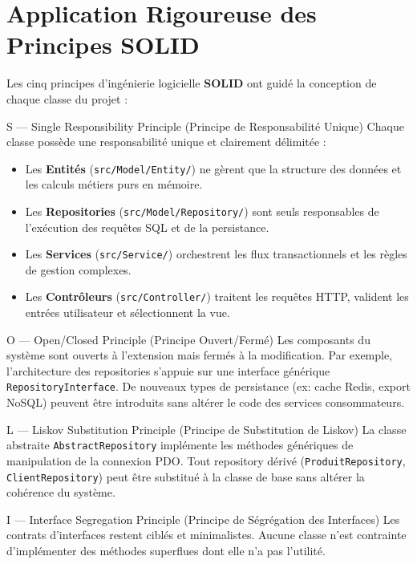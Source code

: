 \documentclass[11pt,a4paper,titlepage,twoside,openright]{report}
\begin{document}
\section{Application Rigoureuse des Principes SOLID}

Les cinq principes d'ingénierie logicielle \textbf{SOLID} ont guidé la conception de chaque classe du projet :

\begin{solidbox}{S — Single Responsibility Principle (Principe de Responsabilité Unique)}
Chaque classe possède une responsabilité unique et clairement délimitée :
\begin{itemize}
    \item Les \textbf{Entités} (\texttt{src/Model/Entity/}) ne gèrent que la structure des données et les calculs métiers purs en mémoire.
    \item Les \textbf{Repositories} (\texttt{src/Model/Repository/}) sont seuls responsables de l'exécution des requêtes SQL et de la persistance.
    \item Les \textbf{Services} (\texttt{src/Service/}) orchestrent les flux transactionnels et les règles de gestion complexes.
    \item Les \textbf{Contrôleurs} (\texttt{src/Controller/}) traitent les requêtes HTTP, valident les entrées utilisateur et sélectionnent la vue.
\end{itemize}
\end{solidbox}

\begin{solidbox}{O — Open/Closed Principle (Principe Ouvert/Fermé)}
Les composants du système sont ouverts à l'extension mais fermés à la modification. Par exemple, l'architecture des repositories s'appuie sur une interface générique \texttt{RepositoryInterface}. De nouveaux types de persistance (ex: cache Redis, export NoSQL) peuvent être introduits sans altérer le code des services consommateurs.
\end{solidbox}

\begin{solidbox}{L — Liskov Substitution Principle (Principe de Substitution de Liskov)}
La classe abstraite \texttt{AbstractRepository} implémente les méthodes génériques de manipulation de la connexion PDO. Tout repository dérivé (\texttt{ProduitRepository}, \texttt{ClientRepository}) peut être substitué à la classe de base sans altérer la cohérence du système.
\end{solidbox}

\begin{solidbox}{I — Interface Segregation Principle (Principe de Ségrégation des Interfaces)}
Les contrats d'interfaces restent ciblés et minimalistes. Aucune classe n'est contrainte d'implémenter des méthodes superflues dont elle n'a pas l'utilité.
\end{solidbox}
\end{document}

